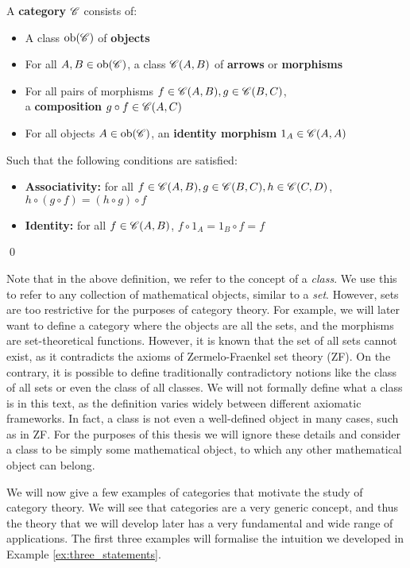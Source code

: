 \documentclass[../thesis.tex]{subfiles}
\begin{document}
\begin{defn}
A \textbf{category} $\mathscr{C}$ consists of:
\begin{itemize}
    \item A class $\operatorname{ob}(\mathscr{C})$ of \textbf{objects}
    \item For all $A,B\in\operatorname{ob}(\mathscr{C})$, a class $\mathscr{C}(A,B)$ of \textbf{arrows} or \textbf{morphisms}
    \item For all pairs of morphisms $f\in \mathscr{C}(A,B), g\in \mathscr{C}(B,C)$,\\a \textbf{composition} $g \circ f \in \mathscr{C}(A,C)$
    \item For all objects $A\in \operatorname{ob}(\mathscr{C})$, an \textbf{identity morphism} $1_A \in \mathscr{C}(A,A)$
\end{itemize}
Such that the following conditions are satisfied:
\begin{itemize}
    \item \textbf{Associativity:} for all $f\in \mathscr{C}(A,B),g\in \mathscr{C}(B,C),h\in \mathscr{C}(C,D)$,\\$h\circ (g\circ f)=(h\circ g)\circ f$
    \item \textbf{Identity:} for all $f\in \mathscr{C}(A,B)$, $f\circ 1_A=1_B\circ f=f$
\end{itemize}

\qed
\end{defn}

Note that in the above definition, we refer to the concept of a \textit{class}.
We use this to refer to any collection of mathematical objects, similar to a \textit{set}.
However, sets are too restrictive for the purposes of category theory.
For example, we will later want to define a category where the objects are all the sets, and the morphisms are set-theoretical functions.
However, it is known that the set of all sets cannot exist, as it contradicts the axioms of Zermelo-Fraenkel set theory (ZF).
On the contrary, it is possible to define traditionally contradictory notions like the class of all sets or even the class of all classes.
We will not formally define what a class is in this text, as the definition varies widely between different axiomatic frameworks.
In fact, a class is not even a well-defined object in many cases, such as in ZF.
For the purposes of this thesis we will ignore these details and consider a class to be simply some mathematical object, to which any other mathematical object can belong.

We will now give a few examples of categories that motivate the study of category theory.
We will see that categories are a very generic concept, and thus the theory that we will develop later has a very fundamental and wide range of applications.
The first three examples will formalise the intuition we developed in Example \ref{ex:three_statements}.
\end{document}
